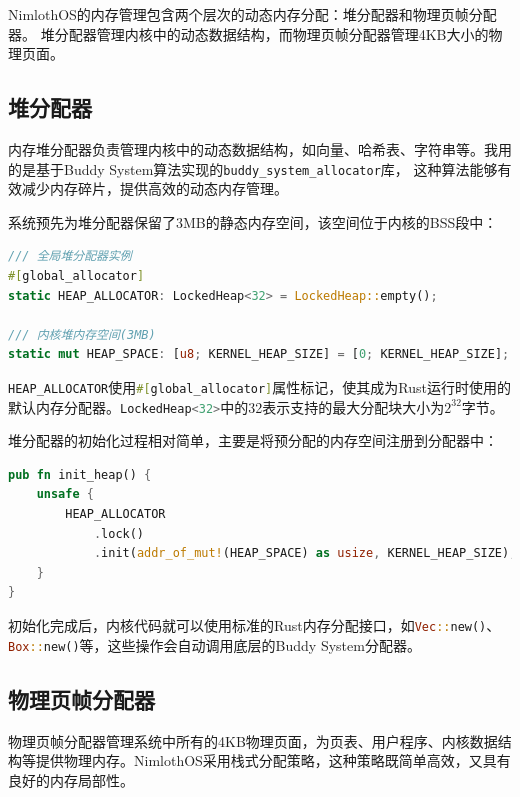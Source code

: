 NimlothOS的内存管理包含两个层次的动态内存分配：堆分配器和物理页帧分配器。
堆分配器管理内核中的动态数据结构，而物理页帧分配器管理4KB大小的物理页面。

\subsection{堆分配器}

内存堆分配器负责管理内核中的动态数据结构，如向量、哈希表、字符串等。我用的是基于Buddy System算法实现的\lstinline[language=Rust]{buddy_system_allocator}库，
这种算法能够有效减少内存碎片，提供高效的动态内存管理。

系统预先为堆分配器保留了3MB的静态内存空间，该空间位于内核的BSS段中：

\begin{lstlisting}[language=Rust,caption={堆分配器声明}, label={lst:heap-decl}]
/// 全局堆分配器实例
#[global_allocator]
static HEAP_ALLOCATOR: LockedHeap<32> = LockedHeap::empty();

/// 内核堆内存空间(3MB)
static mut HEAP_SPACE: [u8; KERNEL_HEAP_SIZE] = [0; KERNEL_HEAP_SIZE];
\end{lstlisting}

\lstinline[language=Rust]{HEAP_ALLOCATOR}使用\lstinline[language=Rust]{#[global_allocator]}属性标记，使其成为Rust运行时使用的默认内存分配器。\lstinline[language=Rust]{LockedHeap<32>}中的32表示支持的最大分配块大小为$2^{32}$字节。

堆分配器的初始化过程相对简单，主要是将预分配的内存空间注册到分配器中：

\begin{lstlisting}[language=Rust,caption={堆分配器初始化}, label={lst:heap-init-func}]
pub fn init_heap() {
    unsafe {
        HEAP_ALLOCATOR
            .lock()
            .init(addr_of_mut!(HEAP_SPACE) as usize, KERNEL_HEAP_SIZE);
    }
}
\end{lstlisting}

初始化完成后，内核代码就可以使用标准的Rust内存分配接口，如\lstinline[language=Rust]{Vec::new()}、\lstinline[language=Rust]{Box::new()}等，这些操作会自动调用底层的Buddy System分配器。

\subsection{物理页帧分配器}

物理页帧分配器管理系统中所有的4KB物理页面，为页表、用户程序、内核数据结构等提供物理内存。NimlothOS采用栈式分配策略，这种策略既简单高效，又具有良好的内存局部性。

